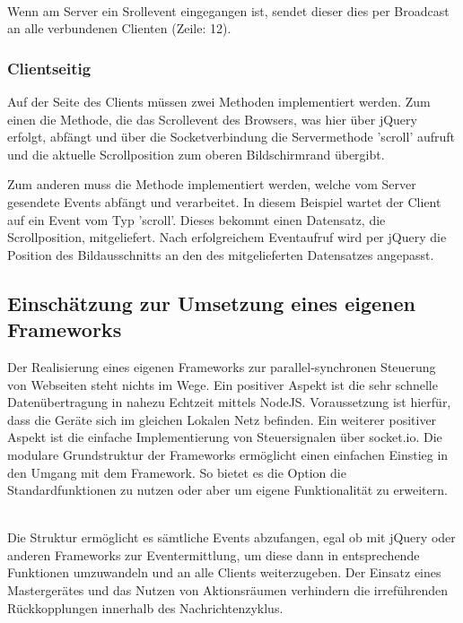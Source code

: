 	\\Wenn am Server ein Srollevent eingegangen ist, sendet dieser dies per Broadcast an alle verbundenen Clienten (Zeile: 12).
	
	\subsubsection{Clientseitig}
	Auf der Seite des Clients müssen zwei Methoden implementiert werden. Zum einen die Methode, die das Scrollevent des Browsers, was hier über jQuery erfolgt, abfängt und über die Socketverbindung die Servermethode 'scroll' aufruft und die aktuelle Scrollposition zum oberen Bildschirmrand übergibt.
	
	
	Zum anderen muss die Methode implementiert werden, welche vom Server gesendete \Gls{Event}s abfängt und verarbeitet. In diesem Beispiel wartet der Client auf ein \Gls{Event} vom Typ 'scroll'. Dieses bekommt einen Datensatz, die Scrollposition, mitgeliefert. Nach erfolgreichem \Gls{Event}aufruf wird per jQuery die Position des Bildausschnitts an den des mitgelieferten Datensatzes angepasst.
	

	\subsection{Einschätzung zur Umsetzung eines eigenen \Gls{Framework}s}
	Der Realisierung eines eigenen \Gls{Framework}s zur \gls{parallel-synchron}en Steuerung von Webseiten steht nichts im Wege. Ein positiver Aspekt ist die sehr schnelle Datenübertragung in nahezu Echtzeit mittels \gls{NodeJS}. Voraussetzung ist hierfür, dass die Geräte sich im gleichen Lokalen Netz befinden. Ein weiterer positiver Aspekt ist die einfache Implementierung von Steuersignalen über socket.io. Die modulare Grundstruktur der \Gls{Framework}s ermöglicht einen einfachen Einstieg in den Umgang mit dem \Gls{Framework}. So bietet es die Option die Standardfunktionen zu nutzen oder aber um eigene Funktionalität zu erweitern.

\\Die Struktur ermöglicht es sämtliche \Gls{Event}s abzufangen, egal ob mit jQuery oder anderen \Gls{Framework}s zur \Gls{Event}ermittlung, um diese dann in entsprechende Funktionen umzuwandeln und an alle Clients weiterzugeben. Der Einsatz eines Mastergerätes und das Nutzen von Aktionsräumen verhindern die irreführenden Rückkopplungen innerhalb des Nachrichtenzyklus. 

